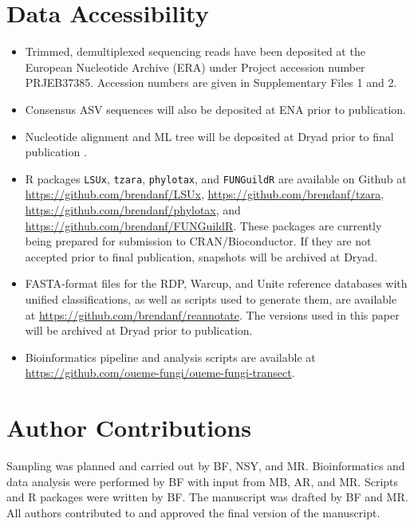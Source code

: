 \documentclass[
  12pt,
]{article}
\providecommand{\tightlist}{%
  \setlength{\itemsep}{0pt}\setlength{\parskip}{0pt}}
\begin{document}
\printbibliography

\doublespacing

\hypertarget{data-accessibility}{%
\section*{Data Accessibility}\label{data-accessibility}}

\begin{itemize}
\tightlist
\item
  Trimmed, demultiplexed sequencing reads have been deposited at the European Nucleotide Archive (ERA) under Project accession number PRJEB37385. Accession numbers are given in Supplementary Files 1 and 2.
\item
  Consensus ASV sequences will also be deposited at ENA prior to publication.
\item
  Nucleotide alignment and ML tree will be deposited at Dryad prior to final publication \autocite{furneauxdata2020}.
\item
  R packages \texttt{LSUx}, \texttt{tzara}, \texttt{phylotax}, and \texttt{FUNGuildR} are available on Github at \url{https://github.com/brendanf/LSUx}, \url{https://github.com/brendanf/tzara}, \url{https://github.com/brendanf/phylotax}, and \url{https://github.com/brendanf/FUNGuildR}.
  These packages are currently being prepared for submission to CRAN/Bioconductor.
  If they are not accepted prior to final publication, snapshots will be archived at Dryad.
\item
  FASTA-format files for the RDP, Warcup, and Unite reference databases with unified classifications, as well as scripts used to generate them, are available at \url{https://github.com/brendanf/reannotate}. The versions used in this paper will be archived at Dryad prior to publication.
\item
  Bioinformatics pipeline and analysis scripts are available at \url{https://github.com/oueme-fungi/oueme-fungi-transect}.
\end{itemize}

\hypertarget{author-contributions}{%
\section*{Author Contributions}\label{author-contributions}}

Sampling was planned and carried out by BF, NSY, and MR.
Bioinformatics and data analysis were performed by BF with input from MB, AR, and MR.
Scripts and R packages were written by BF.
The manuscript was drafted by BF and MR.
All authors contributed to and approved the final version of the manuscript.

\processdelayedfloats
\end{document}
